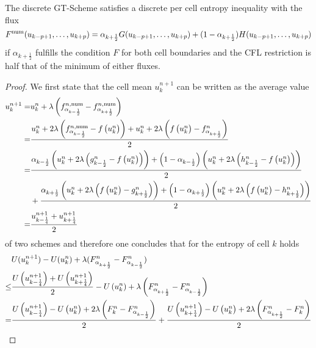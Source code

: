 \begin{theorem}\label{thm:deie}
	The discrete GT-Scheme satisfies a discrete per cell entropy inequality with the flux
	\[
	F^{\mathrm{num}}(u_{k-p+1}, \dots, u_{k+p}) = \alpha_{k+\frac 1 2} G(u_{k-p+1}, \dots, u_{k+p}) + (1-\alpha_{k+\frac 1 2}) H(u_{k-p+1}, \dots, u_{k+p}) 
	\]
	if $\alpha_{k+\frac 1 2}$ fulfills the condition $F$ for both cell boundaries and the CFL restriction is half that of the minimum of either fluxes. 
\end{theorem}
		\begin{proof}
	
	We first state that the cell mean $u^{n+1}_k$ can be written as the average value 
	\[
	\begin{aligned}
	u^{n+1}_k 
	=& u^n_k + \lambda \left (f^{n, \mathrm{num}}_{\alpha_{k-\frac 1 2}} - f^{n, \mathrm{num}}_{\alpha_{k+\frac 1 2}} \right) \\
	=& \frac{u^n_k + 2 \lambda \left(f^{n, \mathrm{num}}_{\alpha_{k-\frac 1 2}} - f\left (u^n_k \right) \right) + u^n_k + 2 \lambda \left(f\left (u^n_k \right)-f^n_{\alpha_{k+\frac 1 2}} \right) } {2} 
	\\
	=& \frac{\alpha_{k-\frac 1 2} \left (u^n_k + 2 \lambda \left(g^n_{k-\frac 1 2} - f\left (u^n_k \right) \right) \right) 
	+ \left(1- \alpha_{k-\frac 1 2} \right)\left(u^n_k + 2 \lambda \left(h^n_{k-\frac 1 2} - f\left (u^n_k \right) \right)\right) }{2}\\
	&+ \frac{\alpha_{k+\frac 1 2} \left(u^n_k + 2 \lambda \left(f\left (u^n_k \right)-g^n_{k+\frac 1 2} \right)\right) 
	+ \left(1-\alpha_{k+\frac 1 2}\right)\left(u^n_k + 2 \lambda \left(f\left (u^n_k \right)-h^n_{k+\frac 1 2} \right) \right) } {2} \\
	=& \frac{u^{n+1}_{k-\frac 1 4} + u ^{n+1}_{k+\frac 1 4}}{2}
	\end{aligned}
	\]
	of two schemes and therefore one concludes that for the entropy of cell $k$ holds 
	\begin{equation}
        \begin{aligned}
		&U(u^{n+1}_k) - U(u^n_k) + \lambda (\Fnn_{\alpha_{k+\frac 1 2}} - \Fnn_{\alpha_{k - \frac 1 2}}) \\
		\leq &
		 \frac {U\of {u^{n+1}_{k-\frac 1 4}} + U \of {u^{n+1}_{k+\frac 1 4}} }{2} - U\of{u^n_k} + \lambda \left( \Fnn_{\alpha_{k+\frac 1 2}} - \Fnn_{\alpha_{k - \frac 1 2}}\right)\\
		= &
		\frac{U\of {u^{n+1}_{k-\frac 1 4}} - U \of{u^n_k} + 2 \lambda \left( F^n_{k} - \Fnn_{\alpha_{k - \frac 1 2}}\right)}{2} 
		+ \frac{U\of {u^{n+1}_{k+\frac 1 4}} - U \of{u^n_k} + 2 \lambda \left( \Fnn_{\alpha_{k+\frac 1 2}} - F^n_{k} \right)}{2} \\

\end{aligned}
\end{equation}
\end{proof}
